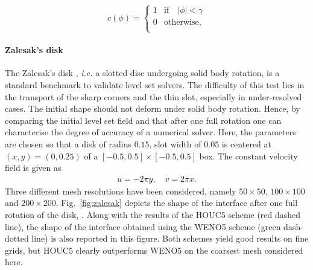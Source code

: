 \begin{equation}
  c(\phi) =
  \begin{cases}
     1 & \textrm{if} \quad  |\phi| < \gamma \\
     0 & \textrm{otherwise}, \\
  \end{cases}
  \label{NB cut-off}
\end{equation}


\paragraph {Zalesak's disk}

The Zalesak's disk \citep{Zalesak_JCP_1979}, \textit{i.e.} a slotted disc undergoing solid body rotation, is a standard benchmark to validate level set solvers. The difficulty of this test lies in the transport of the sharp corners and the thin slot, especially in under-resolved cases. The initial shape should not deform under solid body rotation. Hence, by comparing the initial level set field and that after one full rotation one can characterise the degree of accuracy of a numerical solver. Here, the parameters are chosen so that a disk of radius $0.15$, slot width of $0.05$ is centered at $(x,y)=(0,0.25)$ of a $[-0.5,0.5]\times[-0.5,0.5]$ box. The constant velocity field is given as
\begin{equation}
  \begin{aligned}
  u=-2\pi y, \quad v=2\pi x.
  \end{aligned}
  \label{rot}
\end{equation}
Three different mesh resolutions have been considered, namely $50 \times 50$, $100 \times 100$ and $200 \times 200$. Fig.\ \ref{fig:zalesak} depicts the shape of the interface after one full rotation of the disk, . Along with the results of the HOUC5 scheme (red dashed line), the shape of the interface obtained using the WENO5 scheme (green dash-dotted line) is also reported in this figure. Both schemes yield good results on fine grids, but HOUC5 clearly outperforms WENO5 on the coarsest mesh considered here. %

